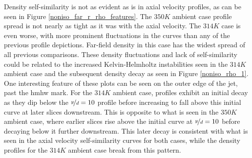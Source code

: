 Density self-similarity is not as evident as is in axial velocity profiles, as can be seen in Figure \ref{noniso_far_r_rho_features}. The $350 K$ ambient case profile spread is not nearly as tight as it was with the axial velocity. The $314 K$ case is even worse, with more prominent fluctuations in the curves than any of the previous profile depictions. Far-field density in this case has the widest spread of all previous comparisons. These density fluctuations and lack of self-similarity could be related to the increased Kelvin-Helmholtz instabilities seen in the $314 K$ ambient case and the subsequent density decay as seen in Figure \ref{noniso_rho_1}. One interesting feature of these plots can be seen on the outer edge of the jet, past the \gls{hmhw} mark. For the $314 K$ ambient case, profiles exhibit an initial decay as they dip below the $\nicefrac{y}{d}=10$ profile before increasing to fall above this initial curve at later slices downstream. This is opposite to what is seen in the $350 K$ ambient case, where earlier slices rise above the initial curve at $\nicefrac{y}{d} = 10$ before decaying below it further downstream. This later decay is consistent with what is seen in the axial velocity self-similarity curves for both cases, while the density profiles for the $314 K$ ambient case break from this pattern. 
